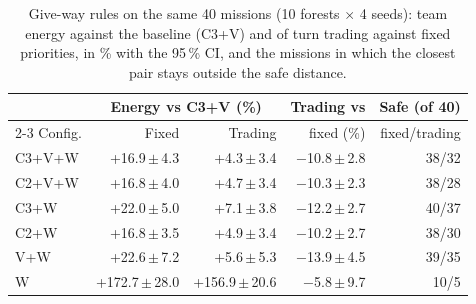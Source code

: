 \begin{table}[t]
\caption{Give-way rules on the same 40 missions (10 forests $\times$ 4 seeds): team energy against the baseline (C3+V) and of turn trading against fixed priorities, in \% with the 95\,\% CI, and the missions in which the closest pair stays outside the safe distance.}
\label{tab:giveway}
\centering\footnotesize\setlength{\tabcolsep}{3pt}
\begin{tabular}{@{}lrrrr@{}}
\toprule
 & \multicolumn{2}{c}{Energy vs C3+V (\%)} & Trading vs & Safe (of 40)\\
\cmidrule(lr){2-3}
Config. & Fixed & Trading & fixed (\%) & fixed/trading\\
\midrule
C3+V+W & +16.9\,$\pm$\,4.3 & +4.3\,$\pm$\,3.4 & $-$10.8\,$\pm$\,2.8 & 38/32\\
C2+V+W & +16.8\,$\pm$\,4.0 & +4.7\,$\pm$\,3.4 & $-$10.3\,$\pm$\,2.3 & 38/28\\
C3+W & +22.0\,$\pm$\,5.0 & +7.1\,$\pm$\,3.8 & $-$12.2\,$\pm$\,2.7 & 40/37\\
C2+W & +16.8\,$\pm$\,3.5 & +4.9\,$\pm$\,3.4 & $-$10.2\,$\pm$\,2.7 & 38/30\\
V+W & +22.6\,$\pm$\,7.2 & +5.6\,$\pm$\,5.3 & $-$13.9\,$\pm$\,4.5 & 39/35\\
W & +172.7\,$\pm$\,28.0 & +156.9\,$\pm$\,20.6 & $-$5.8\,$\pm$\,9.7 & 10/5\\
\bottomrule
\end{tabular}
\end{table}
